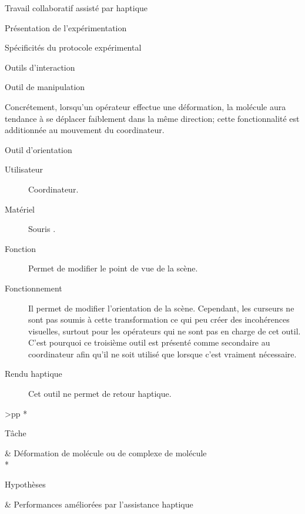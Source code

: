 \documentclass[myfrancais,ngerman,english,french]{mythesis}
\begin{document}
\begin{mychapter}{Travail collaboratif assisté par haptique}
\begin{mysection}{Présentation de l'expérimentation}
\begin{mysubsection}{Spécificités du protocole expérimental}
\begin{mysubsubsection}{Outils d'interaction}
\begin{myparagraph}{Outil de manipulation}
\begin{description}
								Concrétement, lorsqu'un opérateur effectue une déformation, la molécule aura tendance à se déplacer faiblement dans la même direction; cette fonctionnalité est additionnée au mouvement du coordinateur.
						\end{description}
					\end{myparagraph}
					\begin{myparagraph}{Outil d'orientation}
						\begin{description}
							\item[Utilisateur] Coordinateur.
							\item[Matériel] Souris \myUSB.
							\item[Fonction] Permet de modifier le point de vue de la scène.
							\item[Fonctionnement]
								Il permet de modifier l'orientation de la scène.
								Cependant, les curseurs ne sont pas soumis à cette transformation ce qui peu créer des incohérences visuelles, surtout pour les opérateurs qui ne sont pas en charge de cet outil.
								C'est pourquoi ce troisième outil est présenté comme secondaire au coordinateur afin qu'il ne soit utilisé que lorsque c'est vraiment nécessaire.
							\item[Rendu haptique]
								Cet outil ne permet de retour haptique.
						\end{description}
					\end{myparagraph}
				\end{mysubsubsection}
				\begin{mytable}
					\newcommand{\mytitlecolumn}[2]{%
						\multirow{#1}*{%
							\begin{minipage}{6em}%
								\raggedleft #2%
							\end{minipage}%
						}
					}
					\newlength{\expfourfirstcolumn}
					\newlength{\expfoursecondcolumn}
					\setlength{\expfourfirstcolumn}{7em}
					\setlength{\expfoursecondcolumn}{\textwidth}
					\addtolength{\expfoursecondcolumn}{-\expfourfirstcolumn}
					\addtolength{\expfoursecondcolumn}{-4\tabcolsep}
					\begin{mytabular}{>{\bfseries}p{\expfourfirstcolumn}p{\expfoursecondcolumn}}
						\mytoprule
						\mytitlecolumn{1}{Tâche}                   & Déformation de molécule ou de complexe de molécule                 \\
						\mymiddlerule[\heavyrulewidth]
						\mytitlecolumn{3}{Hypothèses}              &  Performances améliorées par l'assistance haptique \\

\end{mytabular}
\end{mytable}
\end{mysubsection}
\end{mysection}
\end{mychapter}
\end{document}
